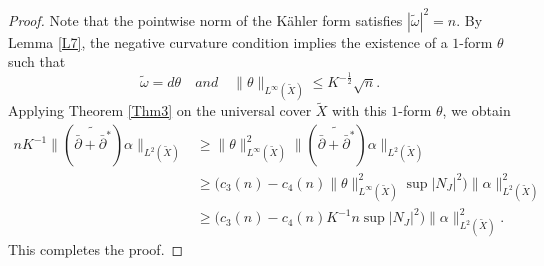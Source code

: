 \documentclass[12pt, twoside]{article}
\theoremstyle{definition}
\numberwithin{equation}{section}
\def \a {\alpha }
\def\w {\omega}
\begin{document}
\begin{proof}
	Note that the pointwise norm of the Kähler form satisfies $|\tilde{\w}|^{2}=n$. By Lemma \ref{L7}, the negative curvature condition implies the existence of a $1$-form $\theta$ such that 
	\[ \tilde{\w}=d\theta\quad and\quad \|\theta\|_{L^{\infty}(\tilde{X})}\leq K^{-\frac{1}{2}}\sqrt{n}.\]
	Applying Theorem \ref{Thm3} on the universal cover $\tilde{X}$ with this $1$-form $\theta$, we obtain
	\begin{equation*}
	\begin{split}
	nK^{-1}\|(\widetilde{\bar{\partial}+\bar{\partial}^{\ast}})\a\|_{L^{2}(\tilde{X})}
	&\geq\|\theta\|^{2}_{L^{\infty}(\tilde{X})}\|(\widetilde{\bar{\partial}+\bar{\partial}^{\ast}})\a\|_{L^{2}(\tilde{X})}\\
	&\geq  \Big(c_{3}(n)-c_{4}(n)\|\theta\|^{2}_{L^{\infty}(\tilde{X})}\sup|N_{J}|^{2}\Big)\|\a\|^{2}_{L^{2}(\tilde{X})}\\
	&\geq \Big(c_{3}(n)-c_{4}(n)K^{-1}n\sup|N_{J}|^{2}\Big)\|\a\|^{2}_{L^{2}(\tilde{X})}.
	\end{split}
	\end{equation*}
	This completes the proof.
\end{proof}
\end{document}
